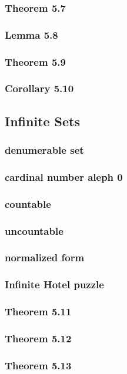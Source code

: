 \documentclass[a4paper]{article}
\begin{document}
\subsubsection*{Theorem 5.7}
\subsubsection*{Lemma 5.8}
\subsubsection*{Theorem 5.9}
\subsubsection*{Corollary 5.10}

\newpage
\subsection{Infinite Sets}   %
\subsubsection*{denumerable set}
\subsubsection*{cardinal number aleph 0}
\subsubsection*{countable}
\subsubsection*{uncountable}
\subsubsection*{normalized form}
\subsubsection*{Infinite Hotel puzzle}
\subsubsection*{Theorem 5.11}
\subsubsection*{Theorem 5.12}
\subsubsection*{Theorem 5.13}
\end{document}
